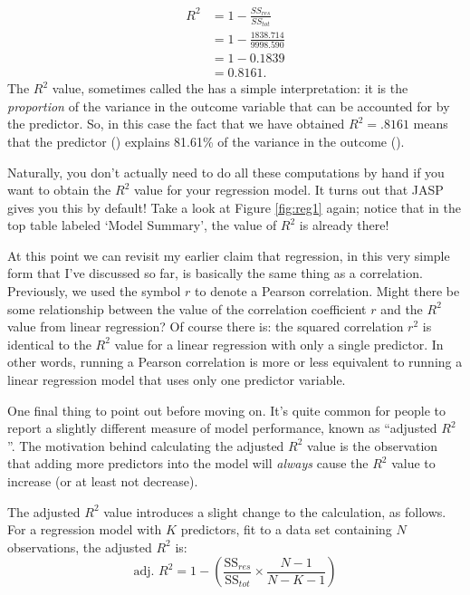 \begin{align*}
  R^2 &= 1-\frac{SS_{res}}{SS_{tot}}\\
      &= 1 - \frac{1838.714}{9998.590}\\
      &= 1-0.1839\\
  &= 0.8161.
\end{align*}
The $R^2$ value, sometimes called the  has a simple interpretation: it is the {\it proportion} of the variance in the outcome variable that can be accounted for by the predictor. So, in this case the fact that we have obtained $R^2 = .8161$ means that the predictor () explains 81.61\% of the variance in the outcome (). 

Naturally, you don't actually need to do all these computations by hand if you want to obtain the $R^2$ value for your regression model. It turns out that JASP gives you this by default!  Take a look at Figure \ref{fig:reg1} again; notice that in the top table labeled `Model Summary', the value of $R^2$ is already there!


At this point we can revisit my earlier claim that regression, in this very simple form that I've discussed so far, is basically the same thing as a correlation. Previously, we used the symbol $r$ to denote a Pearson correlation. Might there be some relationship between the value of the correlation coefficient $r$ and the $R^2$ value from linear regression? Of course there is: the squared correlation $r^2$ is identical to the $R^2$ value for a linear regression with only a single predictor. In other words, running a Pearson correlation is more or less equivalent to running a linear regression model that uses only one predictor variable.


One final thing to point out before moving on. It's quite common for people to report a slightly different measure of model performance, known as ``adjusted $R^2$''. The motivation behind calculating the adjusted $R^2$ value is the observation that adding more predictors into the model will {\it always} cause the $R^2$ value to increase (or at least not decrease). 

\vspace{0.5cm}
\begin{mdframed}[style=MyFrame,nobreak=false]
The adjusted $R^2$ value introduces a slight change to the calculation, as follows. For a regression model with $K$ predictors, fit to a data set containing $N$ observations, the adjusted $R^2$ is:
$$
\mbox{adj. } R^2 = 1 - \left(\frac{\mbox{SS}_{res}}{\mbox{SS}_{tot}} \times \frac{N-1}{N-K-1} \right)
$$
\end{mdframed}

